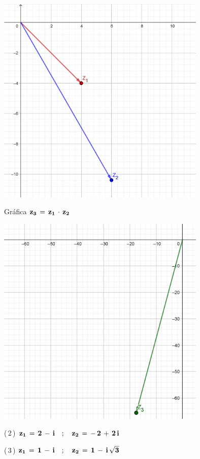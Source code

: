 \documentclass[a4paper,11pt,openany]{book}
\begin{document}
\begin{center}
    \includegraphics[width=10cm]{Gra-Ej-1-1.png}
\end{center}

\newpage

\textcolor{ao(english)}{} Gráfica $\bf{z_{3}\,=\,z_{1}\,\cdot\,z_{2}}$

\begin{center}
    \includegraphics[width=10cm]{Gra-Ej-1-2.png}
\end{center}

\textcolor{ao(english)}{(\,2\,)} $\bf{z_{1}\,=\,2\,-\,i \quad;\quad z_{2}\,=\,-\,2\,+\,2\,i}$

\textcolor{ao(english)}{(\,3\,)} $\bf{z_{1}\,=\,1\,-\,i \quad;\quad z_{2}\,=\,1\,-\,i\,\sqrt{3}}$
\end{document}
